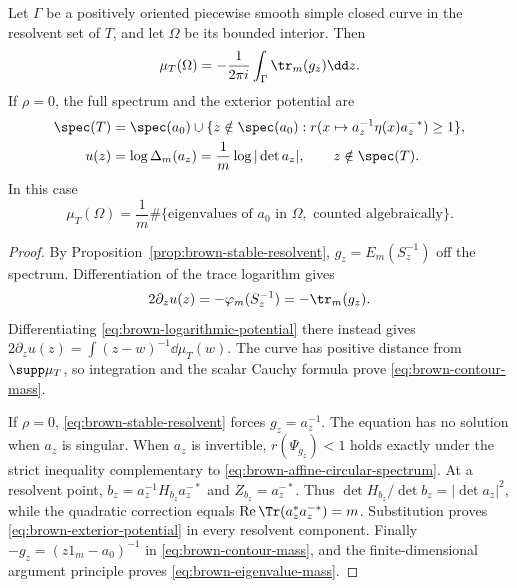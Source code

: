 \begin{corollary}\label{prop:brown-contour-mass}
Let $\Gamma$ be a positively oriented piecewise smooth simple closed curve in the resolvent set of $T$, and let $\Omega$ be its bounded interior.
Then
\begin{equation}\label{eq:brown-contour-mass}
 \mu_T(\Omega)=-\frac1{2\pi i}\int_\Gamma\tr_m(g_z)\dd z.
\end{equation}
If $\rho=0$, the full spectrum and the exterior potential are
\begin{align}
 \spec(T)&=\spec(a_0)\cup
 \{z\notin\spec(a_0):r(x\mapsto a_z^{-1}\eta(x)a_z^{-*})\ge1\},
                                  \label{eq:brown-affine-circular-spectrum}\\
 u(z)&=\log\Delta_m(a_z)
       =\frac1m\log|\det a_z|,
 \qquad z\notin\spec(T).          \label{eq:brown-exterior-potential}
\end{align}
In this case
\begin{equation}\label{eq:brown-eigenvalue-mass}
 \mu_T(\Omega)=\frac1m
   \#\{\text{eigenvalues of }a_0\text{ in }\Omega,
                        \text{ counted algebraically}\}.
\end{equation}
\end{corollary}
\begin{proof}
By Proposition~\ref{prop:brown-stable-resolvent}, $g_z=E_m(S_z^{-1})$ off the spectrum.
Differentiation of the trace logarithm gives
\[
 2\partial_z u(z)=-\varphi_m(S_z^{-1})=-\tr_m(g_z).
\]
Differentiating \eqref{eq:brown-logarithmic-potential} there instead gives $2\partial_z u(z)=\int(z-w)^{-1}\dd\mu_T(w)$.
The curve has positive distance from $\supp\mu_T$, so integration and the scalar Cauchy formula prove \eqref{eq:brown-contour-mass}.

If $\rho=0$, \eqref{eq:brown-stable-resolvent} forces $g_z=a_z^{-1}$.
The equation has no solution when $a_z$ is singular.
When $a_z$ is invertible, $r(\Psi_{g_z})<1$ holds exactly under the strict inequality complementary to \eqref{eq:brown-affine-circular-spectrum}.
At a resolvent point, $b_z=a_z^{-1}H_{b_z}a_z^{-*}$ and $Z_{b_z}=a_z^{-*}$.
Thus $\det H_{b_z}/\det b_z=|\det a_z|^2$, while the quadratic correction equals $\operatorname{Re}\Tr(a_z^*a_z^{-*})=m$.
Substitution proves \eqref{eq:brown-exterior-potential} in every resolvent component.
Finally $-g_z=(z1_m-a_0)^{-1}$ in \eqref{eq:brown-contour-mass}, and the finite-dimensional argument principle proves \eqref{eq:brown-eigenvalue-mass}.
\end{proof}

